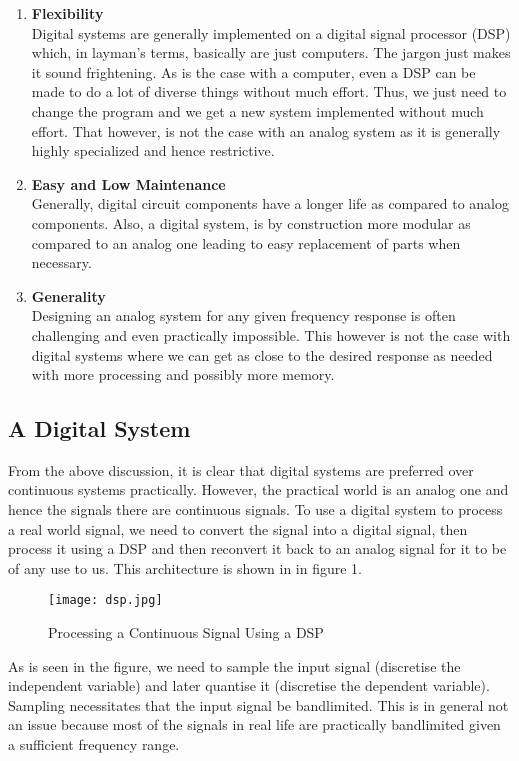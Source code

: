 \begin{enumerate}
\item \textbf{Flexibility}\\
Digital systems are generally implemented on a digital signal processor (DSP) which, in layman's terms, basically are just computers. The jargon just makes it sound frightening. As is the case with a computer, even a DSP can be made to do a lot of diverse things without much effort. Thus, we just need to change the program and we get a new system implemented without much effort. That however, is not the case with an analog system as it is generally highly specialized and hence restrictive.
\item \textbf{Easy and Low Maintenance}\\
Generally, digital circuit components have a longer life as compared to analog components. Also, a digital system, is by construction more modular as compared to an analog one leading to easy replacement of parts when necessary.
\item \textbf{Generality}\\
Designing an analog system for any given frequency response is often challenging and even practically impossible. This however is not the case with digital systems where we can get as close to the desired response as needed with more processing and possibly more memory.
\end{enumerate}

\subsection{A Digital System}
From the above discussion, it is clear that digital systems are preferred over continuous systems practically. However, the practical world is an analog one and hence the signals there are continuous signals. To use a digital system to process a real world signal, we need to convert the signal into a digital signal, then process it using a DSP and then reconvert it back to an analog signal for it to be of any use to us. This architecture is shown in in figure 1.

\begin{figure}
 	\texttt{[image: dsp.jpg]}
    \caption{Processing a Continuous Signal Using a DSP}
\end{figure}

As is seen in the figure, we need to sample the input signal (discretise the independent variable) and later quantise it (discretise the dependent variable). Sampling necessitates that the input signal be bandlimited. This is in general not an issue because most of the signals in real life are practically bandlimited given a sufficient frequency range.

